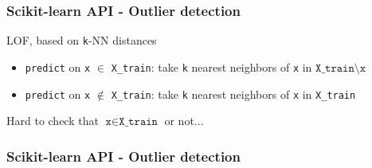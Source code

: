 \documentclass[slidetop,11pt]{beamer}
\begin{document}
\begin{frame}\frametitle{Scikit-learn API - Outlier detection}

LOF, based on \texttt{k}-NN distances

\begin{itemize}
  \item \texttt{predict} on \texttt{x} $\in$ \texttt{X_train}: take \texttt{k} nearest neighbors of \texttt{x} in $\texttt{X_train} \setminus \texttt{x}$
  \item \texttt{predict} on \texttt{x} $\notin$ \texttt{X_train}: take \texttt{k} nearest neighbors of \texttt{x} in \texttt{X_train}
\end{itemize}
\begin{center}
Hard to check that $\texttt{x} \in \texttt{X_train}$ or not...
\end{center}

\end{frame}


\begin{frame}\frametitle{Scikit-learn API - Outlier detection}





\end{frame}
\end{document}
